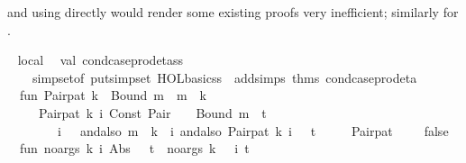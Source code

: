 \begin{isabellebody}
\begin{isamarkuptext}
  and using  directly would render some
  existing proofs very inefficient; similarly for .%
\end{isamarkuptext}\isamarkuptrue%
%
\isadelimML
%
\endisadelimML
%
\isatagML
{}\isamarkupfalse%
\ {\isacartoucheopen}\isanewline
local\isanewline
\ \ val\ cond{\isacharunderscore}{\kern0pt}case{\isacharunderscore}{\kern0pt}prod{\isacharunderscore}{\kern0pt}eta{\isacharunderscore}{\kern0pt}ss\ {\isacharequal}{\kern0pt}\isanewline
\ \ \ \ simpset{\isacharunderscore}{\kern0pt}of\ {\isacharparenleft}{\kern0pt}put{\isacharunderscore}{\kern0pt}simpset\ HOL{\isacharunderscore}{\kern0pt}basic{\isacharunderscore}{\kern0pt}ss\ \isactrlcontext \ addsimps\ {\isacharat}{\kern0pt}{\isacharbraceleft}{\kern0pt}thms\ cond{\isacharunderscore}{\kern0pt}case{\isacharunderscore}{\kern0pt}prod{\isacharunderscore}{\kern0pt}eta{\isacharbraceright}{\kern0pt}{\isacharparenright}{\kern0pt}{\isacharsemicolon}{\kern0pt}\isanewline
\ \ fun\ Pair{\isacharunderscore}{\kern0pt}pat\ k\ {}\ {\isacharparenleft}{\kern0pt}Bound\ m{\isacharparenright}{\kern0pt}\ {\isacharequal}{\kern0pt}\ {\isacharparenleft}{\kern0pt}m\ {\isacharequal}{\kern0pt}\ k{\isacharparenright}{\kern0pt}\isanewline
\ \ \ \ {\isacharbar}{\kern0pt}\ Pair{\isacharunderscore}{\kern0pt}pat\ k\ i\ {\isacharparenleft}{\kern0pt}Const\ {\isacharparenleft}{\kern0pt}\isactrlconstUNDERSCOREname {\isasymopen}Pair{\isasymclose}{\isacharcomma}{\kern0pt}\ \ {\isacharunderscore}{\kern0pt}{\isacharparenright}{\kern0pt}\ {\isachardollar}{\kern0pt}\ Bound\ m\ {\isachardollar}{\kern0pt}\ t{\isacharparenright}{\kern0pt}\ {\isacharequal}{\kern0pt}\isanewline
\ \ \ \ \ \ \ \ i\ {\isachargreater}{\kern0pt}\ {}\ andalso\ m\ {\isacharequal}{\kern0pt}\ k\ {\isacharplus}{\kern0pt}\ i\ andalso\ Pair{\isacharunderscore}{\kern0pt}pat\ k\ {\isacharparenleft}{\kern0pt}i\ {\isacharminus}{\kern0pt}\ {}{\isacharparenright}{\kern0pt}\ t\isanewline
\ \ \ \ {\isacharbar}{\kern0pt}\ Pair{\isacharunderscore}{\kern0pt}pat\ {\isacharunderscore}{\kern0pt}\ {\isacharunderscore}{\kern0pt}\ {\isacharunderscore}{\kern0pt}\ {\isacharequal}{\kern0pt}\ false{\isacharsemicolon}{\kern0pt}\isanewline
\ \ fun\ no{\isacharunderscore}{\kern0pt}args\ k\ i\ {\isacharparenleft}{\kern0pt}Abs\ {\isacharparenleft}{\kern0pt}{\isacharunderscore}{\kern0pt}{\isacharcomma}{\kern0pt}\ {\isacharunderscore}{\kern0pt}{\isacharcomma}{\kern0pt}\ t{\isacharparenright}{\kern0pt}{\isacharparenright}{\kern0pt}\ {\isacharequal}{\kern0pt}\ no{\isacharunderscore}{\kern0pt}args\ {\isacharparenleft}{\kern0pt}k\ {\isacharplus}{\kern0pt}\ {}{\isacharparenright}{\kern0pt}\ i\ t\isanewline

\end{isabellebody}
